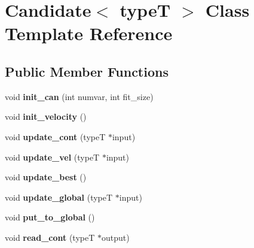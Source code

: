 \hypertarget{classCandidate}{}\section{Candidate$<$ type\+T $>$ Class Template Reference}
\label{classCandidate}
\subsection*{Public Member Functions}
\begin{DoxyCompactItemize}
\item 
\hypertarget{classCandidate_a7d6563ae2246654a7b3e4c34a8f38e7f}{}void {\bfseries init\+\_\+can} (int numvar, int fit\+\_\+size)\label{classCandidate_a7d6563ae2246654a7b3e4c34a8f38e7f}

\item 
\hypertarget{classCandidate_adb4ae80a8dc02e8cb85df4d8c651d53c}{}void {\bfseries init\+\_\+velocity} ()\label{classCandidate_adb4ae80a8dc02e8cb85df4d8c651d53c}

\item 
\hypertarget{classCandidate_abc542c3e498ddc6e1bbf016c28ba035a}{}void {\bfseries update\+\_\+cont} (type\+T $\ast$input)\label{classCandidate_abc542c3e498ddc6e1bbf016c28ba035a}

\item 
\hypertarget{classCandidate_a66100c3779eadc81ab5bacbd4fe1d4b7}{}void {\bfseries update\+\_\+vel} (type\+T $\ast$input)\label{classCandidate_a66100c3779eadc81ab5bacbd4fe1d4b7}

\item 
\hypertarget{classCandidate_a60027d49ca1f7684245a0f9fe2864f30}{}void {\bfseries update\+\_\+best} ()\label{classCandidate_a60027d49ca1f7684245a0f9fe2864f30}

\item 
\hypertarget{classCandidate_abccd308b73aab3dd6c6403269fff2e66}{}void {\bfseries update\+\_\+global} (type\+T $\ast$input)\label{classCandidate_abccd308b73aab3dd6c6403269fff2e66}

\item 
\hypertarget{classCandidate_a68623f87b2353804a936704983de417f}{}void {\bfseries put\+\_\+to\+\_\+global} ()\label{classCandidate_a68623f87b2353804a936704983de417f}

\item 
\hypertarget{classCandidate_a5f781b1a2e563492fb33449df4196897}{}void {\bfseries read\+\_\+cont} (type\+T $\ast$output)\label{classCandidate_a5f781b1a2e563492fb33449df4196897}


\end{DoxyCompactItemize}
